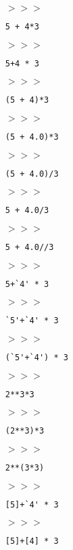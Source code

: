 \documentclass[11pt]{article}
\begin{document}
\begin{itemize}
\item[$>>>$] \begin{verbatim}5 + 4*3\end{verbatim}
\item[$>>>$] \begin{verbatim}5+4 * 3\end{verbatim}
\item[$>>>$] \begin{verbatim}(5 + 4)*3\end{verbatim}
\item[$>>>$] \begin{verbatim}(5 + 4.0)*3\end{verbatim}
\item[$>>>$] \begin{verbatim}(5 + 4.0)/3\end{verbatim}
\item[$>>>$] \begin{verbatim}5 + 4.0/3\end{verbatim}
\item[$>>>$] \begin{verbatim}5 + 4.0//3\end{verbatim}
\item[$>>>$] \begin{verbatim}5+`4' * 3\end{verbatim}
\item[$>>>$] \begin{verbatim}`5'+`4' * 3\end{verbatim}
\item[$>>>$] \begin{verbatim}(`5'+`4') * 3\end{verbatim}
\item[$>>>$] \begin{verbatim}2**3*3\end{verbatim}
\item[$>>>$] \begin{verbatim}(2**3)*3\end{verbatim}
\item[$>>>$] \begin{verbatim}2**(3*3)\end{verbatim}
\item[$>>>$] \begin{verbatim}[5]+`4' * 3\end{verbatim}
\item[$>>>$] \begin{verbatim}[5]+[4] * 3\end{verbatim}

\end{itemize}
\end{document}
